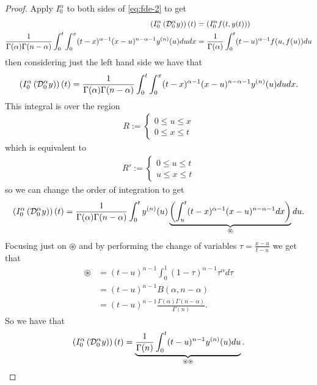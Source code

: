 \documentclass{article}
\begin{document}
\begin{proof}
	Apply $ I_0^\alpha $ to both sides of \eqref{eq:fde-2} to get
	\begin{align}
		\rli{0}{\alpha}{\rld{0}{\alpha}{y}}(t) &= \rli{0}{\alpha}{f(t,y(t))} \nonumber \\
		\label{eq:fde-volt-equiv-1}
 		\frac{1}{\Gamma(\alpha)\Gamma(n-\alpha)} \int_0^t \int_0^x (t-x)^{\alpha-1}(x-u)^{n-\alpha-1}y^{(n)}(u) du dx &= \frac{1}{\Gamma(\alpha)} \int_0^t (t-u)^{\alpha-1} f(u,f(u))du 
	\end{align}
	then considering just the left hand side we have that 
	\begin{align*}
		\left( I_{0}^{\alpha} \left( \mathcal{D}_{0}^{\alpha} y \right) \right)(t) &= \frac{1}{\Gamma(\alpha)\Gamma(n-\alpha)} \int_0^t \int_0^x (t-x)^{\alpha-1}(x-u)^{n-\alpha-1}y^{(n)}(u) du dx. \\
	\end{align*}
	This integral is over the region 
	\begin{align*}
		R :=
		\begin{cases}
			0 \leq u \leq x \\
			0 \leq x \leq t
		\end{cases}
	\end{align*}
	which is equivalent to 
		\begin{align*}
		R' :=
		\begin{cases}
			0 \leq u \leq t \\
			u \leq x \leq t
		\end{cases}
	\end{align*}
	so we can change the order of integration to get
	\begin{align*}
		\left( I_{0}^{\alpha} \left( \mathcal{D}_{0}^{\alpha} y \right) \right)(t) &= \frac{1}{\Gamma(\alpha)\Gamma(n-\alpha)} \int_0^t y^{(n)}(u) \underbrace{\left(\int_u^t (t-x)^{\alpha-1}(x-u)^{n-\alpha-1} dx \right)}_{\circledast} du.\\
	\end{align*}
	Focusing just on $ \circledast $ and by performing the change of variables $ \tau = \frac{x-u}{t-u} $ we get that
	\begin{align*}
		\circledast &= (t-u)^{n-1} \int_0^1 (1-\tau)^{\alpha-1}\tau^\alpha d\tau \\
			&= (t-u)^{n-1} B(\alpha, n-\alpha) \\
			&= (t-u)^{n-1} \frac{\Gamma(\alpha)\Gamma(n-\alpha)}{\Gamma(n)}.
	\end{align*}
	So we have that 
	\begin{align*}
		\rli{0}{\alpha}{\rld{0}{\alpha}{y}}(t) = \underbrace{\frac{1}{\Gamma(n)} \int_0^t (t-u)^{n-1} y^{(n)}(u) du}_{\circledast \circledast}.

\end{align*}
\end{proof}
\end{document}
